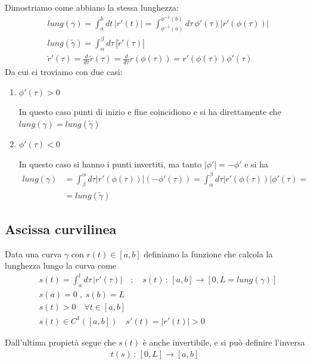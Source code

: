 Dimostriamo come abbiano la stessa lunghezza:
\begin{align}
&lung(\gamma)= \int_{a}^{b} dt \, |r'(t)|=\int_{\phi^{-1}(a)}^{\phi^{-1}(b)} d\tau \, \phi'(\tau)|r'(	\phi(\tau))| \\
&lung(\tilde{\gamma})= \int_{\alpha}^{\beta} d\tau \, |\tilde{r}'(\tau)| \\
& \tilde{r}'(\tau)= \frac{d}{d\tau} \tilde{r}(\tau) = \frac{d}{d\tau} r(\phi(\tau))=r'(\phi(\tau))
\phi'(\tau)
\end{align}
Da cui ci troviamo con due casi:
\begin{enumerate}
	\item $\phi'(\tau)>0$
	
	In questo caso punti di inizio e fine coincidiono e si ha direttamente che $lung(\gamma)=lung(\tilde{\gamma})$
	
	\item $\phi'(\tau)<0$
	
	In questo caso si hanno i punti invertiti, ma tanto $|\phi'|=-\phi'$ e si ha
	\begin{align}
	lung(\gamma){}&=\int_{\beta}^{\alpha} d\tau |r'(\phi(\tau))|(-\phi'(\tau))=\int_{\alpha}^{\beta} d\tau |r'(\phi(\tau))|\phi'(\tau)= \nonumber \\
	&=lung(\tilde{\gamma})
	\end{align}
\end{enumerate}

\newpage

\subsection{Ascissa curvilinea}

Data una curva $\gamma$ con $r(t)\in[a,b]$ definiamo la funzione che calcola la lunghezza lungo la curva come
\begin{align}
{}&s(t)=\int_{a}^{t} d\tau \, |r'(\tau)| \quad ; \quad s(t) \, : \, [a,b] \longrightarrow [0,L=lung(\gamma)]\\
&s(a)=0 \; , \; s(b)=L \\
&s(t)>0 \quad \forall t \in [a,b]\\
&s(t)\in C^1([a,b]) \quad s'(t)=|r'(t)|>0
\end{align}

Dall'ultima propietà segue che $s(t)$ è anche invertibile, e si può definire l'inversa
\begin{align}
t(s) \, : \, [0,L]\longrightarrow[a,b]
\end{align}

